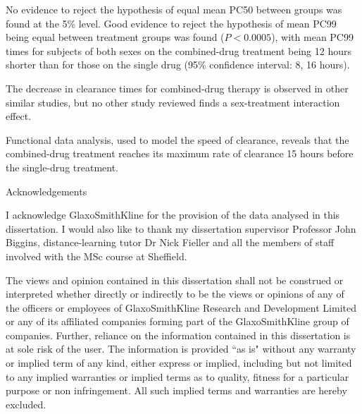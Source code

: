 \documentclass[a4paper,12pt,openright,twoside]{book}
\begin{document}
No evidence to reject the hypothesis of equal mean PC50 between groups was found at the 5\% level. Good evidence to reject the hypothesis of mean PC99 being equal between treatment groups was found ($P<0.0005$), with mean PC99 times for subjects of both sexes on the combined-drug treatment being 12 hours shorter than for those on the single drug (95\% confidence interval: 8, 16 hours).

The decrease in clearance times for combined-drug therapy is observed in other similar studies, but no other study reviewed finds a sex-treatment interaction effect.

Functional data analysis, used to model the speed of clearance, reveals that the combined-drug treatment reaches its maximum rate of clearance 15 hours before the single-drug treatment.
\pagebreak
\begin{center}
{\large Acknowledgements}\\[1cm]
\end{center}
I acknowledge GlaxoSmithKline for the provision of the data analysed in this dissertation.
I would also like to thank my dissertation supervisor Professor John Biggins, distance-learning tutor Dr Nick Fieller and all the members of staff involved with the MSc course at Sheffield. 

\pagebreak
\vspace*{\fill}
{\large The views and opinion contained in this dissertation shall not be construed or interpreted whether directly or indirectly to be the views or opinions of any of the officers or employees of GlaxoSmithKline Research and Development Limited or any of its affiliated companies forming part of the GlaxoSmithKline group of companies. Further, reliance on the information contained in this dissertation is at sole risk of the user. The information is provided ``as is" without any warranty or implied term of any kind, either express or implied, including but not limited to any implied warranties or implied terms as to quality, fitness for a particular purpose or non infringement. All such implied terms and warranties are hereby excluded.}
\vspace*{\fill}
\tableofcontents

\mainmatter
\setlength{\parindent}{0.0in}
\setlength{\parskip}{0.1in}







\addappheadtotoc
\appendix
\appendixpage


\backmatter

\renewcommand{\bibname}{References}
{\singlespace}
\end{document}
